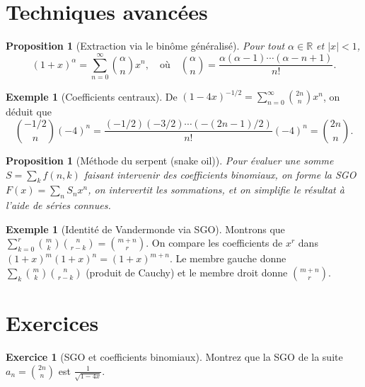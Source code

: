 \documentclass[12pt,a4paper,openany]{book}
\theoremstyle{definition}
\newtheorem{exemple}[definition]{Exemple}
\newtheorem{exercice}{Exercice}[chapter]
\theoremstyle{plain}
\newtheorem{proposition}[definition]{Proposition}
\theoremstyle{remark}
\newcommand{\R}{\mathbb{R}}
\newcommand{\abs}[1]{\left|#1\right|}
\begin{document}
\section{Techniques avancées}
\label{sec:gen-avancees}

\begin{proposition}[Extraction via le binôme généralisé]
\label{prop:binome-generalise}
Pour tout $\alpha \in \R$ et $\abs{x} < 1$,
\[
  (1+x)^{\alpha} = \sum_{n=0}^{\infty} \binom{\alpha}{n} x^n,
  \quad \text{où} \quad
  \binom{\alpha}{n} = \frac{\alpha(\alpha-1)\cdots(\alpha-n+1)}{n!}.
\]
\end{proposition}

\begin{exemple}[Coefficients centraux]
\label{ex:coefficients-centraux}
De $(1-4x)^{-1/2} = \sum_{n=0}^\infty \binom{2n}{n} x^n$, on déduit que
\[
  \binom{-1/2}{n}(-4)^n = \frac{(-1/2)(-3/2)\cdots(-(2n-1)/2)}{n!}(-4)^n = \binom{2n}{n}.
\]
\end{exemple}

\begin{proposition}[Méthode du serpent (snake oil)]
\label{prop:snake-oil}
Pour évaluer une somme $S = \sum_k f(n,k)$ faisant intervenir des coefficients
binomiaux, on forme la SGO $F(x) = \sum_n S_n x^n$, on intervertit les sommations,
et on simplifie le résultat à l'aide de séries connues.
\end{proposition}

\begin{exemple}[Identité de Vandermonde via SGO]
\label{ex:vandermonde-ogf}
Montrons que $\sum_{k=0}^{r} \binom{m}{k}\binom{n}{r-k} = \binom{m+n}{r}$.
On compare les coefficients de $x^r$ dans $(1+x)^m (1+x)^n = (1+x)^{m+n}$.
Le membre gauche donne $\sum_k \binom{m}{k}\binom{n}{r-k}$ (produit de Cauchy)
et le membre droit donne $\binom{m+n}{r}$.
\end{exemple}

\section{Exercices}
\label{sec:gen-exercices}

\begin{exercice}[SGO et coefficients binomiaux]
\label{exo:ogf-binomial}
Montrez que la SGO de la suite $a_n = \binom{2n}{n}$ est
$\frac{1}{\sqrt{1-4x}}$.
\end{exercice}
\end{document}
